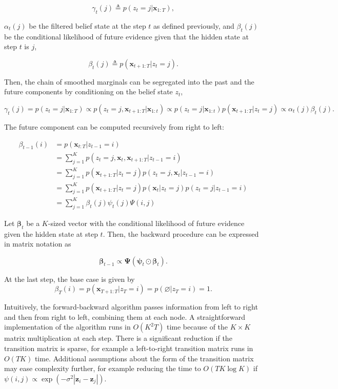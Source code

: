 \documentclass[]{article}
\newcommand{\mat}[1]{\mathbf{#1}}
\begin{document}
\[
\gamma_t(j)
  \triangleq p(z_t = j | \mat{x}_{1:T}),
\]

\(\alpha_t(j)\) be the filtered belief state at the step \(t\) as
defined previously, and \(\beta_t(j)\) be the conditional likelihood of
future evidence given that the hidden state at step \(t\) is \(j\),

\[
\beta_t(j) 
  \triangleq p(\mat{x}_{t+1:T} | z_t = j).
\]

Then, the chain of smoothed marginals can be segregated into the past
and the future components by conditioning on the belief state \(z_t\),

\[
\gamma_t(j)
  = p(z_t = j | \mat{x}_{1:T})
  \propto p(z_t = j,  \mat{x}_{t+1:T} | \mat{x}_{1:t})
  \propto p(z_t = j | \mat{x}_{1:t}) p(\mat{x}_{t+1:T} | z_t = j)
  \propto \alpha_t(j) \beta_t(j).
\]

The future component can be computed recursively from right to left:

\begin{align*}
\beta_{t-1}(i)
  &= p(\mat{x}_{t:T} | z_{t-1} = i) \\
  &= \sum_{j=1}^{K}{p(z_t =j, \mat{x}_{t}, \mat{x}_{t+1:T} | z_{t-1} = i)} \\
  &= \sum_{j=1}^{K}{p(\mat{x}_{t+1:T} | z_t = j)p(z_t = j, \mat{x}_{t} | z_{t-1} = i)} \\
  &= \sum_{j=1}^{K}{p(\mat{x}_{t+1:T} | z_t = j)p(\mat{x}_t | z_t = j)p(z_t = j | z_{t-1} = i)} \\
  &= \sum_{j=1}^{K}{\beta_t(j) \psi_t(j) \Psi(i, j)}
\end{align*}

Let \(\mat{\beta}_t\) be a \(K\)-sized vector with the conditional
likelihood of future evidence given the hidden state at step \(t\).
Then, the backward procedure can be expressed in matrix notation as

\[
\mat{\beta}_{t-1} \propto \mat{\Psi} (\mat{\psi}_t \odot \mat{\beta}_{t}).
\]

At the last step, the base case is given by \[
\beta_{T}(i)
  = p(\mat{x}_{T+1:T} | z_{T} = i) = p(\varnothing | z_T = i) = 1.
\]

Intuitively, the forward-backward algorithm passes information from left
to right and then from right to left, combining them at each node. A
straightforward implementation of the algorithm runs in \(O(K^2 T)\)
time because of the \(K \times K\) matrix multiplication at each step.
There is a significant reduction if the transition matrix is sparse, for
example a left-to-right transition matrix runs in \(O(TK)\) time.
Additional assumptions about the form of the transition matrix may ease
complexity further, for example reducing the time to \(O(TK\log K)\) if
\(\psi(i, j) \propto \exp(-\sigma^2 |\mat{z}_i - \mat{z}_j|)\).
\end{document}
